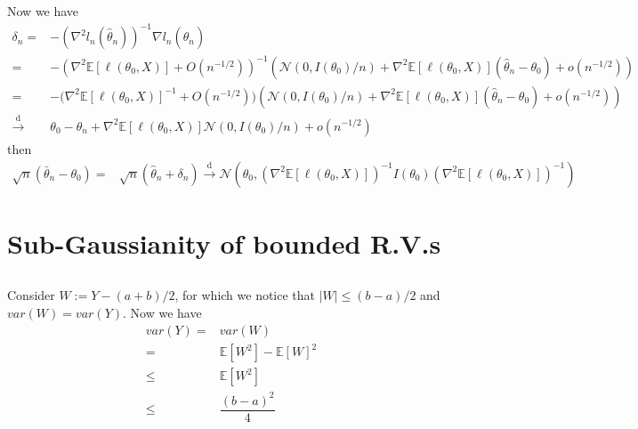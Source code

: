 \documentclass[11pt,a4paper]{ctexart}
\numberwithin{equation}{section}%
\begin{document}
Now we have
\begin{align*}
    \delta _n  =& - (\nabla^2 l_n(\hat{\theta } _n))^{-1} \nabla l_n(\hat{\theta } _n) \\
    =& - (\nabla^2 \mathbb{E}\left[ \ell(\theta _0,X) \right] + O(n^{-1/2}))^{-1} (\mathcal{N}(0, I(\theta _0)/n)+\nabla^2 \mathbb{E}\left[ \ell(\theta _0,X) \right](\hat{\theta }_n- \theta _0) + o(n^{-1/2})) \\
    =& - \big( \nabla^2 \mathbb{E}\left[ \ell(\theta _0,X) \right]^{-1} + O(n^{-1/2}) ) (\mathcal{N}(0, I(\theta _0)/n)+\nabla^2 \mathbb{E}\left[ \ell(\theta _0,X) \right](\hat{\theta }_n- \theta _0) + o(n^{-1/2}))  \\
    \xrightarrow[]{\mathrm{d}} &\theta _0 - \hat{\theta }_n + \nabla^2 \mathbb{E}\left[ \ell(\theta _0,X) \right]\mathcal{N}(0, I(\theta _0)/n) + o(n^{-1/2})
\end{align*}
then
\begin{align*}
    \sqrt{n}(\bar{\theta }_n-\theta _0)=& \sqrt{n}(\hat{\theta }_n + \delta _n) \xrightarrow[]{\mathrm{d}} \mathcal{N}(\theta _0, (\nabla^2 \mathbb{E}\left[ \ell(\theta _0,X) \right])^{-1}I(\theta _0)(\nabla^2 \mathbb{E}\left[ \ell(\theta _0,X) \right])^{-1})
\end{align*}

\section{Sub-Gaussianity of bounded R.V.s}

\subsection{}

Consider $ W:= Y-(a+b)/2 $, for which we notice that $ \left\vert W \right\vert \leq (b-a)/2 $ and $ var(W)=var(Y) $. Now we have
\begin{align*}
    var(Y)= & var(W)\\
    =& \mathbb{E}\left[ W^2 \right] - \mathbb{E}\left[ W \right]^2 \\
    \leq & \mathbb{E}\left[ W^2 \right] \\
    \leq & \dfrac{ (b-a)^2 }{ 4 } 
\end{align*}
\end{document}
